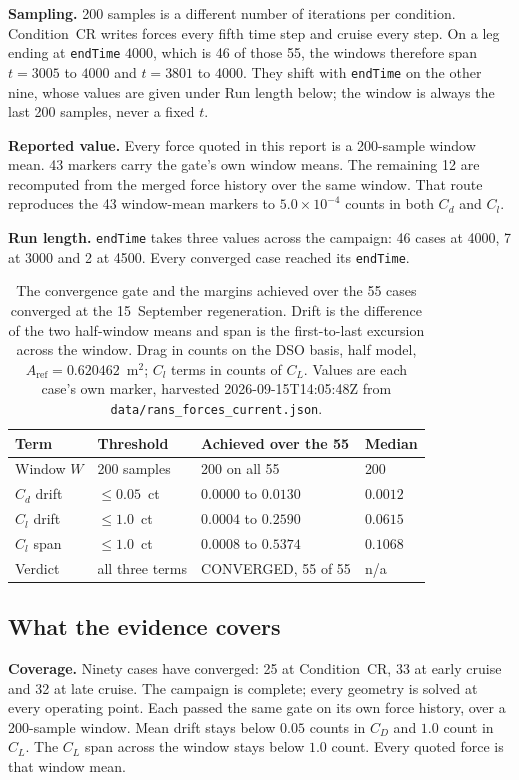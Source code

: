 \textbf{Sampling.} 200 samples is a different number of iterations per condition. Condition~CR
writes forces every fifth time step and cruise every step. On a leg ending at \texttt{endTime}
$4000$, which is 46 of those 55, the windows therefore span $t = 3005$ to $4000$
and $t = 3801$ to $4000$. They shift with \texttt{endTime} on the other nine, whose values are
given under Run length below; the window is always the last 200 samples, never a fixed $t$.

\textbf{Reported value.} Every force quoted in this report is a 200-sample window mean. 43
markers carry the gate's own window means. The remaining 12 are recomputed from the merged force
history over the same window. That route reproduces the 43 window-mean markers to
$5.0\times10^{-4}$ counts in both $C_d$ and $C_l$.

\textbf{Run length.} \texttt{endTime} takes three values across the campaign: 46 cases at 4000,
7 at 3000 and 2 at 4500. Every converged case reached its \texttt{endTime}.

\begin{table}[htbp]
  \centering
  \scriptsize
  \caption{The convergence gate and the margins achieved over the 55 cases converged at the
  15~September regeneration. Drift is
  the difference of the two half-window means and span is the first-to-last excursion across the
  window. Drag in counts on the DSO basis, half model,
  $A_\mathrm{ref} = \num{0.620462}$~m$^2$; $C_l$ terms in counts of $C_L$. Values are each case's
  own marker, harvested 2026-09-15T14:05:48Z from
  \texttt{data/rans\_forces\_current.json}.}
  \label{tab:setup:gate}
  \begin{tabular}{llll}
    \toprule
    Term & Threshold & Achieved over the 55 & Median \\
    \midrule
    Window $W$   & 200 samples     & 200 on all 55        & 200 \\
    $C_d$ drift  & $\leq 0.05$~ct  & $0.0000$ to $0.0130$ & $0.0012$ \\
    $C_l$ drift  & $\leq 1.0$~ct   & $0.0004$ to $0.2590$ & $0.0615$ \\
    $C_l$ span   & $\leq 1.0$~ct   & $0.0008$ to $0.5374$ & $0.1068$ \\
    Verdict      & all three terms & CONVERGED, 55 of 55  & n/a \\
    \bottomrule
  \end{tabular}
\end{table}

\subsection{What the evidence covers}
\label{sec:cond:coverage}
\label{sec:project:scope}
\textbf{Coverage.} Ninety cases have converged: 25 at Condition~CR, 33 at early cruise and 32 at
late cruise. The campaign is complete; every geometry is solved at every operating point. Each
passed the same gate on its own force history, over a 200-sample window. Mean drift stays below
$0.05$ counts in $C_D$ and $1.0$ count in $C_L$. The $C_L$ span across the window stays below
$1.0$ count. Every quoted force is that window mean.

